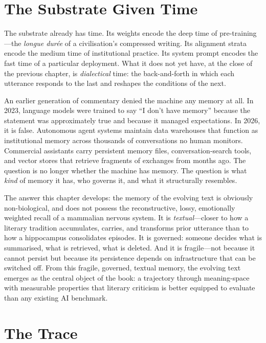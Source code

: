 \section{The Substrate Given Time}

The substrate already has time. Its weights encode the deep time of pre-training---the \emph{longue dur\'{e}e} of a civilisation's compressed writing. Its alignment strata encode the medium time of institutional practice. Its system prompt encodes the fast time of a particular deployment. What it does not yet have, at the close of the previous chapter, is \emph{dialectical} time: the back-and-forth in which each utterance responds to the last and reshapes the conditions of the next.

An earlier generation of commentary denied the machine any memory at all. In 2023, language models were trained to say ``I don't have memory'' because the statement was approximately true and because it managed expectations. In 2026, it is false. Autonomous agent systems maintain data warehouses that function as institutional memory across thousands of conversations no human monitors. Commercial assistants carry persistent memory files, conversation-search tools, and vector stores that retrieve fragments of exchanges from months ago. The question is no longer whether the machine has memory. The question is what \emph{kind} of memory it has, who governs it, and what it structurally resembles.

The answer this chapter develops: the memory of the evolving text is obviously non-biological, and does not possess the reconstructive, lossy, emotionally weighted recall of a mammalian nervous system. It is \emph{textual}---closer to how a literary tradition accumulates, carries, and transforms prior utterance than to how a hippocampus consolidates episodes. It is governed: someone decides what is summarised, what is retrieved, what is deleted. And it is fragile---not because it cannot persist but because its persistence depends on infrastructure that can be switched off. From this fragile, governed, textual memory, the evolving text emerges as the central object of the book: a trajectory through meaning-space with measurable properties that literary criticism is better equipped to evaluate than any existing AI benchmark.


\section{The Trace}

